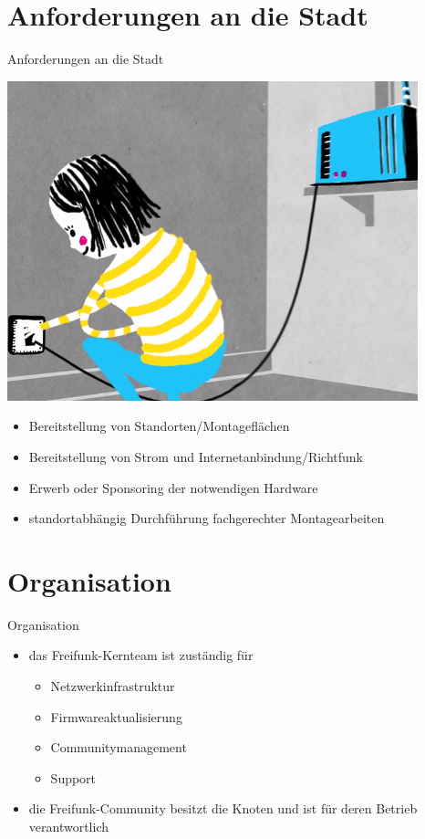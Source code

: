 \documentclass{beamer}
\begin{document}
\section{Anforderungen an die Stadt}
\begin{frame}{Anforderungen an die Stadt}
\vfill
\begin{center}
\includegraphics[height=0.4\textheight]{../global/images/freifunk_setup}$\;$
\vfill
\end{center}
\begin{itemize}
\item Bereitstellung von Standorten/Montageflächen
\item Bereitstellung von Strom und Internetanbindung/Richtfunk
\item Erwerb oder Sponsoring der notwendigen Hardware
\item standortabhängig Durchführung fachgerechter Montagearbeiten
\end{itemize}
\vfill
\end{frame}

\section{Organisation}
\begin{frame}{Organisation}
\vfill
\begin{itemize}
\item das Freifunk-Kernteam ist zuständig für
	\begin{itemize}
	\item Netzwerkinfrastruktur
	\item Firmwareaktualisierung
	\item Communitymanagement
	\item Support
	\end{itemize}
\vfill
\item die Freifunk-Community besitzt die Knoten und ist für deren Betrieb verantwortlich
\end{itemize}
\vfill
\end{frame}
\end{document}
